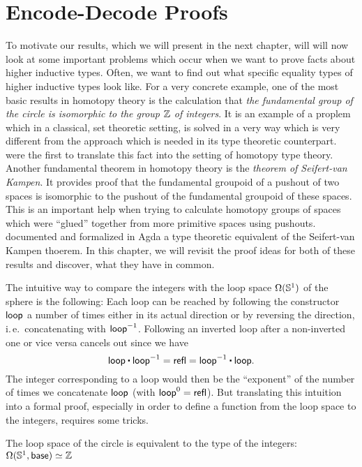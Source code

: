 \section{Encode-Decode Proofs}\label{sec:hit-encode-decode}

To motivate our results, which we will present in the next chapter,
will will now look at some important problems which occur when
we want to prove facts about higher inductive types.
Often, we want to find out what specific equality types of
higher inductive types look like.
For a very concrete example, one of the most basic results in homotopy theory
is the calculation that \emph{the fundamental group of the circle is
isomorphic to the group $\mathbb Z$ of integers}.
It is an example of a proplem which in a classical, set theoretic setting,
is solved in a very way which is very different from the approach which is needed
in its type theoretic counterpart.
\cite{licataShulman_circle} were the first to translate this fact into the
setting of homotopy type theory.
Another fundamental theorem in homotopy theory is the \emph{theorem of
Seifert-van Kampen}.
It provides proof that the fundamental groupoid of a pushout of two spaces is
isomorphic to the pushout of the fundamental groupoid of these spaces.
This is an important help when trying to calculate homotopy groups of spaces
which were ``glued'' together from more primitive spaces using pushouts.
\cite{favonia:SvK} documented and formalized in Agda a type theoretic
equivalent of the Seifert-van Kampen thoerem.
In this chapter, we will revisit the proof ideas for both of these results
and discover, what they have in common.

The intuitive way to compare the integers with the loop space
$\Omega(\mathbb{S}^1)$ of the sphere is the following:
Each loop can be reached by following the constructor $\mathsf{loop}$ a number of
times either in its actual direction or by reversing the direction, i.\,e.\
concatenating with $\mathsf{loop} ^{-1}$.
Following an inverted loop after a non-inverted one or vice versa cancels out since
we have
\begin{equation*}
\Sloop \ct \Sloop \inv = \refl = \Sloop \inv \ct \Sloop \text{.}
\end{equation*}
The integer corresponding to a loop would then be the ``exponent'' of the number
of times we concatenate $\mathsf{loop}$ (with $\mathsf{loop}^0 = \mathsf{refl}$).
But translating this intuition into a formal proof, especially in order
to define a function from the loop space to the integers, requires some tricks.
\begin{thm}[Loop Space of the Circle, \cite{licataShulman_circle}]\label{thm:hit-s1}
The loop space of the circle is equivalent to the
type of the integers: $\Omega(\mathbb{S}^1, \mathsf{base}) \simeq \mathbb Z$
\end{thm}

